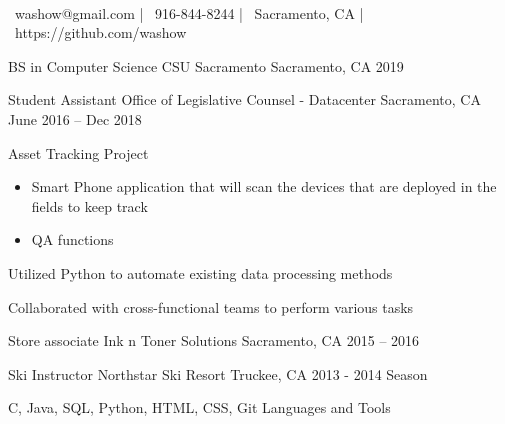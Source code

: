 \documentclass[]{awesome-cv}
\begin{document}
    
\begin{center}
	  \\
	\vspace{2mm}
	{\faEnvelope\ washow@gmail.com} | {\faMobile\ 916-844-8244} | {\faMapMarker\ Sacramento, CA} | {\faLink\ https://github.com/washow}
\end{center}
\vspace{2mm}
\begin{cventries}
	\cventry
	{BS in Computer Science}
	{CSU Sacramento}
	{Sacramento, CA}
	{2019}
	{}
\end{cventries}

\vspace{-1mm}
\begin{cventries}
	\cventry
	{Student Assistant}
	{Office of Legislative Counsel - Datacenter}
	{Sacramento, CA}
	{June 2016 – Dec 2018}
	{\begin{cvitems}
		\item Asset Tracking Project
		\begin{itemize}
		    \item Smart Phone application that will scan the devices that are deployed in the fields to keep track
		    \item QA functions
		\end{itemize}
		\item Utilized Python to automate existing data processing methods
		\item Collaborated with cross-functional teams to perform various tasks
		\end{cvitems}
	}
	{}
	
    \vspace{3mm}
	\cventry
	{Store associate}
	{Ink n Toner Solutions}
	{Sacramento, CA}
	{2015 – 2016}
	{}
	
    \cventry
    {Ski Instructor}
    {Northstar Ski Resort}
    {Truckee, CA}
    {2013 - 2014 Season}
    {}
\end{cventries}
\begin{cventries}
	\cventry
	{C, Java, SQL, Python, HTML, CSS, Git}
	{Languages and Tools}
	{}
	{}
	{}
\end{cventries}
\end{document}
